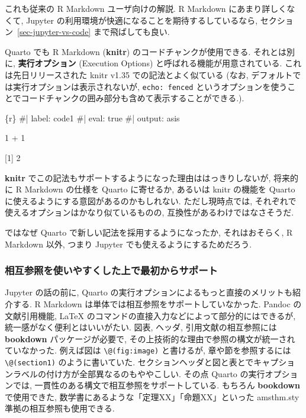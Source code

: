 \documentclass[
  letterpaper,
  DIV=11,
  pandoc,
  ja=standard,
  jafont=noto-otf]{bxjsarticle}
\newenvironment{Shaded}{\begin{snugshade}}{\end{snugshade}}
\newcommand{\DecValTok}[1]{\textcolor[rgb]{0.68,0.00,0.00}{#1}}
\newcommand{\KeywordTok}[1]{\textcolor[rgb]{0.00,0.48,0.65}{#1}}
\newcommand{\NormalTok}[1]{\textcolor[rgb]{0.00,0.48,0.65}{#1}}
\newcommand{\OperatorTok}[1]{\textcolor[rgb]{0.37,0.37,0.37}{#1}}
\begin{document}
これも従来の R Markdown ユーザ向けの解説. R Markdown
にあまり詳しくなくて, Jupyter
の利用環境が快適になることを期待するしているなら,
セクション~\ref{sec-jupyter-vs-code} まで飛ばしても良い.

Quarto でも R Markdown (\textbf{knitr}) のコードチャンクが使用できる.
それとは別に, \textbf{実行オプション} (Execution Options)
と呼ばれる機能が用意されている. これは先日リリースされた knitr v1.35
での記法とよく似ている (なお,
デフォルトでは実行オプションは表示されないが, \texttt{echo:\ fenced}
というオプションを使うことでコードチャンクの囲み部分も含めて表示することができる.).

\begin{Shaded}
\begin{Highlighting}[]
\NormalTok{\textasciigrave{}\textasciigrave{}\textasciigrave{}}\OperatorTok{\{}\NormalTok{r}\OperatorTok{\}}
\NormalTok{\#}\OperatorTok{|}\NormalTok{ label}\OperatorTok{:}\NormalTok{ code1}
\NormalTok{\#}\OperatorTok{|}\NormalTok{ eval}\OperatorTok{:} \KeywordTok{true}
\NormalTok{\#}\OperatorTok{|}\NormalTok{ output}\OperatorTok{:}\NormalTok{ asis}

\DecValTok{1} \OperatorTok{+} \DecValTok{1}
\NormalTok{\textasciigrave{}\textasciigrave{}\textasciigrave{}}
\end{Highlighting}
\end{Shaded}

{[}1{]} 2

\textbf{knitr}
でこの記法もサポートするようになった理由ははっきりしないが, 将来的に R
Markdown の仕様を Quarto に寄せるか, あるいは knitr の機能を Quarto
に使えるようにする意図があるのかもしれない. ただし現時点では,
それぞれで使えるオプションはかなり似ているものの,
互換性があるわけではなさそうだ.

ではなぜ Quarto で新しい記法を採用するようになったか, それはおそらく, R
Markdown 以外, つまり Jupyter でも使えるようにするためだろう.

\hypertarget{sec-crossref}{%
\subsubsection{相互参照を使いやすくした上で最初からサポート}\label{sec-crossref}}

Jupyter の話の前に, Quarto
の実行オプションによるもっと直接のメリットも紹介する. R Markdown
は単体では相互参照をサポートしていなかった. Pandoc の文献引用機能, LaTeX
のコマンドの直接入力などによって部分的にはできるが,
統一感がなく便利とはいいがたい. 図表, ヘッダ, 引用文献の相互参照には
\textbf{bookdown} パッケージが必要で,
その上技術的な理由で参照の構文が統一されていなかった. 例えば図は
\texttt{\textbackslash{}@(fig:image)} と書けるが, 章や節を参照するには
\texttt{\textbackslash{}@(section1)} のように書いていた.
セクションヘッダと図と表とでキャプションラベルの付け方が全部異なるのもややこしい.
その点 Quarto の実行オプションでは,
一貫性のある構文で相互参照をサポートしている. もちろん \textbf{bookdown}
で使用できた, 数学書にあるような「定理XX」「命題XX」といった amsthm.sty
準拠の相互参照も使用できる.
\end{document}
